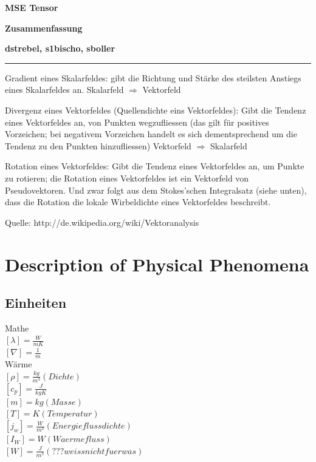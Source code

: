 \documentclass[a4paper]{scrartcl}
\begin{document}
\pagestyle{fancy}
\fancyhf{} 
\fancyfoot[C]{\thepage} %
\renewcommand{\headrulewidth}{0pt}
\renewcommand{\footrulewidth}{0.5pt}

 \centerline{\LARGE \bf \textsf{MSE Tensor}} 
 \smallskip
\centerline{\Large \bf \textsf {Zusammenfassung}}
\medskip
  \centerline{\bf \textsf{dstrebel, s1bischo, sboller }}

 \smallskip \noindent\rule{\textwidth}{0.5pt}
\smallskip%




Gradient eines Skalarfeldes: gibt die Richtung und Stärke des steilsten Anstiegs
eines Skalarfeldes an.
Skalarfeld $\Rightarrow$ Vektorfeld

Divergenz eines Vektorfeldes (Quellendichte eins Vektorfeldes): Gibt die Tendenz
eines Vektorfeldes an, von Punkten wegzufliessen (das gilt für positives
Vorzeichen; bei negativem Vorzeichen handelt es sich dementsprechend um die
Tendenz zu den Punkten hinzufliessen) Vektorfeld $\Rightarrow$ Skalarfeld

Rotation eines Vektorfeldes: Gibt die Tendenz eines Vektorfeldes an, um Punkte
zu rotieren; die Rotation eines Vektorfeldes ist ein Vektorfeld von
Pseudovektoren. Und zwar folgt aus dem Stokes’schen Integralsatz (siehe unten),
dass die Rotation die lokale Wirbeldichte eines Vektorfeldes beschreibt.

Quelle: http://de.wikipedia.org/wiki/Vektoranalysis



\section{Description of Physical Phenomena}
\subsection{Einheiten}

Mathe\\
$ [\lambda]=\frac{W}{mK} $\\
$ [\nabla]=\frac{1}{m} $\\

Wärme\\
$ [\rho]=\frac{kg}{m^3} (Dichte)$\\
$ [c_p]=\frac{J}{kgK} $\\
$ [m]=kg (Masse)$\\
$ [T]=K (Temperatur)$\\
$ [j_w]=\frac{W}{m^2} (Energieflussdichte)$\\
$ [I_W]=W (Waermefluss)$\\
$ [W]=\frac{J}{m^3} (???weiss nicht fuer was)$\\
\end{document}
